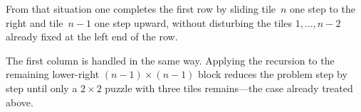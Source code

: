 From that situation one completes the first row by sliding tile~\(n\) one step
to the right and tile~\(n-1\) one step upward, without disturbing the tiles
\(1,\ldots,n-2\) already fixed at the left end of the row.

The first column is handled in the same way. Applying the recursion to the
remaining lower-right \((n-1)\times(n-1)\) block reduces the problem step by
step until only a \(2\times 2\) puzzle with three tiles remains---the case
already treated above.